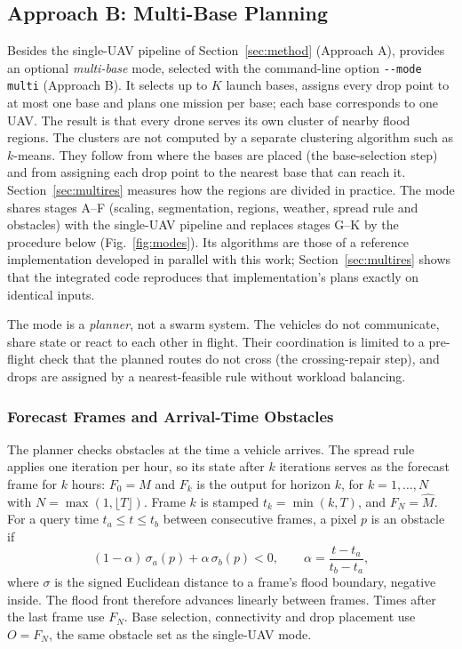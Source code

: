 \subsection{Approach B: Multi-Base Planning}
\label{sec:multi}

Besides the single-UAV pipeline of Section~\ref{sec:method} (Approach A), \adapt{} provides an optional \emph{multi-base} mode, selected with the command-line option \texttt{-{}-mode multi} (Approach B). It selects up to $K$ launch bases, assigns every drop point to at most one base and plans one mission per base; each base corresponds to one UAV. The result is that every drone serves its own cluster of nearby flood regions. The clusters are not computed by a separate clustering algorithm such as $k$-means. They follow from where the bases are placed (the base-selection step) and from assigning each drop point to the nearest base that can reach it. Section~\ref{sec:multires} measures how the regions are divided in practice. The mode shares stages A--F (scaling, segmentation, regions, weather, spread rule and obstacles) with the single-UAV pipeline and replaces stages G--K by the procedure below (Fig.~\ref{fig:modes}). Its algorithms are those of a reference implementation developed in parallel with this work; Section~\ref{sec:multires} shows that the integrated code reproduces that implementation's plans exactly on identical inputs.

The mode is a \emph{planner}, not a swarm system. The vehicles do not communicate, share state or react to each other in flight. Their coordination is limited to a pre-flight check that the planned routes do not cross (the crossing-repair step), and drops are assigned by a nearest-feasible rule without workload balancing.



\subsubsection{Forecast Frames and Arrival-Time Obstacles}
The planner checks obstacles at the time a vehicle arrives. The spread rule applies one iteration per hour, so its state after $k$ iterations serves as the forecast frame for $k$ hours: $F_0=M$ and $F_k$ is the output for horizon $k$, for $k=1,\dots,N$ with $N=\max(1,\lfloor T\rfloor)$. Frame $k$ is stamped $t_k=\min(k,T)$, and $F_N=\hat M$. For a query time $t_a\le t\le t_b$ between consecutive frames, a pixel $p$ is an obstacle if
\begin{equation}
(1-\alpha)\,\sigma_a(p)+\alpha\,\sigma_b(p)<0,\qquad \alpha=\frac{t-t_a}{t_b-t_a},
\label{eq:front}
\end{equation}
where $\sigma$ is the signed Euclidean distance to a frame's flood boundary, negative inside. The flood front therefore advances linearly between frames. Times after the last frame use $F_N$. Base selection, connectivity and drop placement use $O=F_N$, the same obstacle set as the single-UAV mode.

